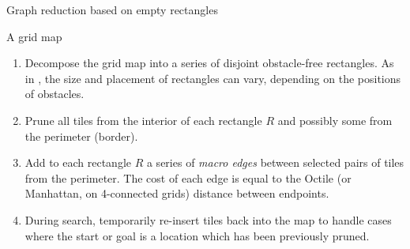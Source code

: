 \begin{algorithm}
\caption{Graph reduction based on empty rectangles}
\label{alg:rsr}
\begin{algorithmic}
\REQUIRE A grid map 
\begin{enumerate}
\item{\label{alg:rsr:1} Decompose the grid map into a series of disjoint
obstacle-free rectangles. 
As in \cite{harabor10}, the size and placement of rectangles can vary, depending on the positions of obstacles.}
\item{\label{alg:rsr:2} Prune all tiles from the interior of each rectangle $R$
and possibly some from the perimeter (border).}
\item{\label{alg:rsr:3} Add to each rectangle $R$ a series of \emph{macro edges} between 
selected pairs of tiles from the perimeter. The cost of each edge is equal to
the Octile (or Manhattan, on 4-connected grids) distance between endpoints.}
\item{\label{alg:rsr:4} During search, temporarily re-insert tiles back into the map to handle cases where the
start or goal is a location which has been previously pruned.}
\end{enumerate}
\end{algorithmic}
\end{algorithm}

